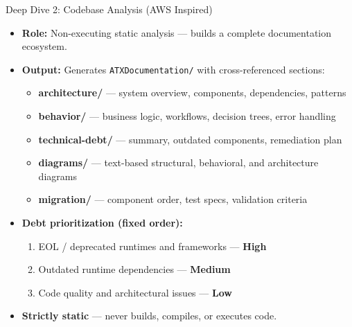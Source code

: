 \documentclass[aspectratio=169]{beamer}
\begin{document}
\begin{frame}{Deep Dive 2: Codebase Analysis (AWS Inspired)}
\begin{itemize}
  \item \textbf{Role:} Non-executing static analysis --- builds a complete documentation ecosystem.
  \item \textbf{Output:} Generates \texttt{ATXDocumentation/} with cross-referenced sections:
  \begin{itemize}
    \item \textbf{architecture/} --- system overview, components, dependencies, patterns
    \item \textbf{behavior/} --- business logic, workflows, decision trees, error handling
    \item \textbf{technical-debt/} --- summary, outdated components, remediation plan
    \item \textbf{diagrams/} --- text-based structural, behavioral, and architecture diagrams
    \item \textbf{migration/} --- component order, test specs, validation criteria
  \end{itemize}
  \item \textbf{Debt prioritization (fixed order):}
  \begin{enumerate}
    \item EOL / deprecated runtimes and frameworks --- \textbf{High}
    \item Outdated runtime dependencies --- \textbf{Medium}
    \item Code quality and architectural issues --- \textbf{Low}
  \end{enumerate}
  \item \textbf{Strictly static} --- never builds, compiles, or executes code.
\end{itemize}
\end{frame}
\end{document}
